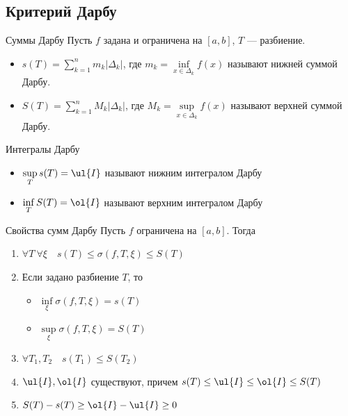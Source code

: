 \subsection{Критерий Дарбу}

\begin{defn}{Суммы Дарбу}{}
    Пусть \( f \) задана и ограничена на \( [a, b] \), \( T \) --- разбиение.

    \begin{itemize}
        \item
            \( s(T) = \sum\limits_{k = 1}^{n} m_k |\Delta_k| \),
            где \( m_k = \inf\limits_{x \in \Delta_k} f(x) \) называют нижней суммой Дарбу.
        \item
            \( S(T) = \sum\limits_{k = 1}^{n} M_k |\Delta_k| \),
            где \( M_k = \sup\limits_{x \in \Delta_k} f(x) \) называют верхней суммой Дарбу.
    \end{itemize}
\end{defn}

\begin{defn}{Интегралы Дарбу}{}
    \begin{itemize}
        \item
            \( \sup\limits_{T} s(T) = \ul{I} \) называют нижним интегралом Дарбу
        \item
            \( \inf\limits_{T} S(T) = \ol{I} \) называют верхним интегралом Дарбу
    \end{itemize}
\end{defn}

\begin{thrm}{Свойства сумм Дарбу}{}
    Пусть \( f \) ограничена на \( [a, b] \). Тогда
    \begin{enumerate}
        \item
            \( \forall T \ \forall \xi \quad s(T) \leq \sigma(f, T, \xi) \leq S(T) \)
        \item
            Если задано разбиение \( T \), то
            \begin{itemize}
                \item
                    \( \inf\limits_{\xi} \sigma(f, T, \xi) = s(T) \)
                \item
                    \( \sup\limits_{\xi} \sigma(f, T, \xi) = S(T) \)
            \end{itemize}
        \item
            \( \forall T_1, T_2 \quad s(T_1) \leq S(T_2) \)
        \item
            \( \ul{I}, \ol{I} \) существуют, причем \( s(T) \leq \ul{I} \leq \ol{I} \leq S(T) \)
        \item
            \( S(T) - s(T) \geq \ol{I} - \ul{I} \geq 0 \)
    \end{enumerate}
\end{thrm}

